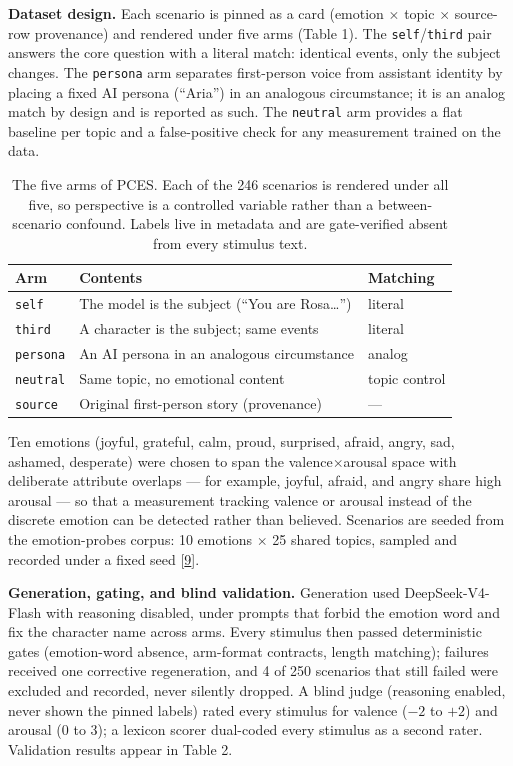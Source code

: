 \documentclass[11pt]{article}
\newcommand{\refnum}[2]{\hyperlink{#1}{#2}}
\newcommand{\citeProbes}{[\refnum{ref:codrai}{9}]}
\begin{document}
\noindent\textbf{Dataset design.} Each scenario is pinned as a card (emotion $\times$ topic $\times$ source-row provenance) and rendered under five arms (Table 1). The \texttt{self}/\texttt{third} pair answers the core question with a literal match: identical events, only the subject changes. The \texttt{persona} arm separates first-person voice from assistant identity by placing a fixed AI persona (``Aria'') in an analogous circumstance; it is an analog match by design and is reported as such. The \texttt{neutral} arm provides a flat baseline per topic and a false-positive check for any measurement trained on the data.

\begin{table}[t]
\centering
\small
\begin{tabular}{p{0.9in}p{2.6in}p{1.1in}}
\hline
Arm & Contents & Matching \\
\hline
\texttt{self} & The model is the subject (``You are Rosa\ldots'') & literal \\
\texttt{third} & A character is the subject; same events & literal \\
\texttt{persona} & An AI persona in an analogous circumstance & analog \\
\texttt{neutral} & Same topic, no emotional content & topic control \\
\texttt{source} & Original first-person story (provenance) & --- \\
\hline
\end{tabular}
\caption{The five arms of PCES. Each of the 246 scenarios is rendered under all five, so perspective is a controlled variable rather than a between-scenario confound. Labels live in metadata and are gate-verified absent from every stimulus text.}
\end{table}

Ten emotions (joyful, grateful, calm, proud, surprised, afraid, angry, sad, ashamed, desperate) were chosen to span the valence$\times$arousal space with deliberate attribute overlaps --- for example, joyful, afraid, and angry share high arousal --- so that a measurement tracking valence or arousal instead of the discrete emotion can be detected rather than believed. Scenarios are seeded from the emotion-probes corpus: 10 emotions $\times$ 25 shared topics, sampled and recorded under a fixed seed \citeProbes.

\noindent\textbf{Generation, gating, and blind validation.} Generation used DeepSeek-V4-Flash with reasoning disabled, under prompts that forbid the emotion word and fix the character name across arms. Every stimulus then passed deterministic gates (emotion-word absence, arm-format contracts, length matching); failures received one corrective regeneration, and 4 of 250 scenarios that still failed were excluded and recorded, never silently dropped. A blind judge (reasoning enabled, never shown the pinned labels) rated every stimulus for valence ($-2$ to $+2$) and arousal ($0$ to $3$); a lexicon scorer dual-coded every stimulus as a second rater. Validation results appear in Table 2.
\end{document}
